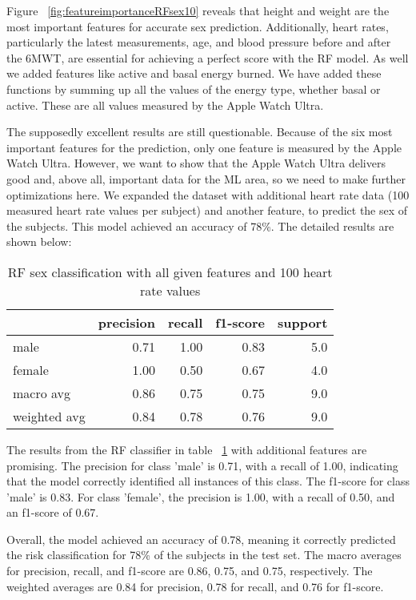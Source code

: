 Figure ~\ref{fig:featureimportanceRFsex10} reveals that height and weight are the most important features for accurate sex prediction. Additionally, heart rates, particularly the latest measurements, age, and blood pressure before and after the 6MWT, are essential for achieving a perfect score with the RF model. As well we added features like active and basal energy burned. We have added these functions by summing up all the values of the energy type, whether basal or active. These are all values measured by the Apple Watch Ultra.

The supposedly excellent results are still questionable. Because of the six most important features for the prediction, only one feature is measured by the Apple Watch Ultra. However, we want to show that the Apple Watch Ultra delivers good and, above all, important data for the ML area, so we need to make further optimizations here. We expanded the dataset with additional heart rate data (100 measured heart rate values per subject) and another feature, to predict the sex of the subjects. This model achieved an accuracy of 78\%. The detailed results are shown below:

\begin{table}[H]
\centering
\begin{tabular}{lrrrr}
\toprule
{} &  precision &    recall &  f1-score &   support \\
\midrule
male            &   0.71 &  1.00 &  0.83 &  5.0 \\
female            &   1.00 &  0.50 &  0.67 &  4.0 \\
macro avg    &   0.86 &  0.75 &  0.75 &  9.0 \\
weighted avg &   0.84 &  0.78 &  0.76 &  9.0 \\
\bottomrule
\end{tabular}
\caption{RF sex classification with all given features and 100 heart rate values}
\label{table:RFageHeartrate100weightheigt}
\end{table}

The results from the RF classifier in table ~\ref{table:RFageHeartrate100weightheigt} with additional features are promising. The precision for class 'male' is 0.71, with a recall of 1.00, indicating that the model correctly identified all instances of this class. The f1-score for class 'male' is 0.83. For class 'female', the precision is 1.00, with a recall of 0.50, and an f1-score of 0.67.

Overall, the model achieved an accuracy of 0.78, meaning it correctly predicted the risk classification for 78\% of the subjects in the test set. The macro averages for precision, recall, and f1-score are 0.86, 0.75, and 0.75, respectively. The weighted averages are 0.84 for precision, 0.78 for recall, and 0.76 for f1-score.


